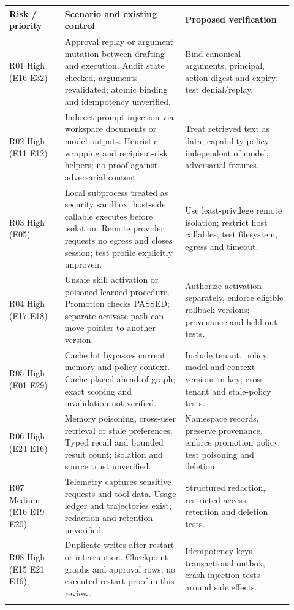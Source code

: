 \documentclass[10pt,letterpaper]{article}
\begin{document}
\begin{longtable}{@{}>{\raggedright\arraybackslash}p{0.18\linewidth}>{\raggedright\arraybackslash}p{0.39\linewidth}>{\raggedright\arraybackslash}p{0.35\linewidth}@{}}
\toprule
Risk / priority & Scenario and existing control & Proposed verification\\\midrule\endhead
R01 High (E16 E32) & Approval replay or argument mutation between drafting and execution. Audit state checked, arguments revalidated; atomic binding and idempotency unverified. & Bind canonical arguments, principal, action digest and expiry; test denial/replay.\\\addlinespace
R02 High (E11 E12) & Indirect prompt injection via workspace documents or model outputs. Heuristic wrapping and recipient-risk helpers; no proof against adversarial content. & Treat retrieved text as data; capability policy independent of model; adversarial fixtures.\\\addlinespace
R03 High (E05) & Local subprocess treated as security sandbox; host-side callable executes before isolation. Remote provider requests no egress and closes session; test profile explicitly unproven. & Use least-privilege remote isolation; restrict host callables; test filesystem, egress and timeout.\\\addlinespace
R04 High (E17 E18) & Unsafe skill activation or poisoned learned procedure. Promotion checks PASSED; separate activate path can move pointer to another version. & Authorize activation separately, enforce eligible rollback versions; provenance and held-out tests.\\\addlinespace
R05 High (E01 E29) & Cache hit bypasses current memory and policy context. Cache placed ahead of graph; exact scoping and invalidation not verified. & Include tenant, policy, model and context versions in key; cross-tenant and stale-policy tests.\\\addlinespace
R06 High (E24 E16) & Memory poisoning, cross-user retrieval or stale preferences. Typed recall and bounded result count; isolation and source trust unverified. & Namespace records, preserve provenance, enforce promotion policy, test poisoning and deletion.\\\addlinespace
R07 Medium (E16 E19 E20) & Telemetry captures sensitive requests and tool data. Usage ledger and trajectories exist; redaction and retention unverified. & Structured redaction, restricted access, retention and deletion tests.\\\addlinespace
R08 High (E15 E21 E16) & Duplicate writes after restart or interruption. Checkpoint graphs and approval rows; no executed restart proof in this review. & Idempotency keys, transactional outbox, crash-injection tests around side effects.\\\addlinespace

\end{longtable}
\end{document}
